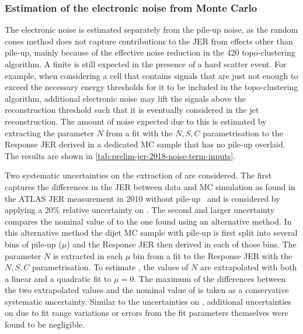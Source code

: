 \subsubsection{Estimation of the electronic noise from Monte Carlo}
\label{subsec:electronic-noise-extraction}
The electronic noise is estimated separately from the pile-up noise, as the random cones method does not capture contributions to the JER from effects other than pile-up, mainly because of the effective noise reduction in the 420 topo-clustering algorithm.
A finite \Nmuzero is still expected in the presence of a hard scatter event.
For example, when considering a cell that contains signals that are just not enough to exceed the necessary energy thresholds for it to be included in the topo-clustering algorithm, additional electronic noise may lift the signals above the reconstruction threshold such that it is eventually considered in the jet reconstruction.
The amount of noise expected due to this is estimated by extracting the parameter $N$ from a fit with the $N, S, C$ parametrisation to the Response JER derived in a dedicated MC sample that has no pile-up overlaid.
The results are shown in \cref{tab:prelim-jer-2018-noise-term-inputs}.

Two systematic uncertainties on the extraction of \Nmuzero are considered. The first captures the differences in the JER between data and MC simulation as found in the ATLAS JER measurement in 2010 without pile-up~\cite{PERF-2011-04} and is considered by applying a 20\% relative uncertainty on \Nmuzero. The second and larger uncertainty compares the nominal value of \Nmuzero to the one found using an alternative method. In this alternative method the dijet MC sample with pile-up is first split into several bins of pile-up ($\mu$) and the Response JER then derived in each of those bins. The parameter $N$ is extracted in each $\mu$ bin from a fit to the Response JER with the $N, S, C$ parametrisation. To estimate \Nmuzero, the values of $N$ are extrapolated with both a linear and a quadratic fit to $\mu=0$. The maximum of the differences between the two extrapolated values and the nominal value of \Nmuzero is taken as a conservative systematic uncertainty.
Similar to the uncertainties on \Npileup, additional uncertainties on \Nmuzero due to fit range variations or errors from the fit parameters themselves were found to be negligible.


